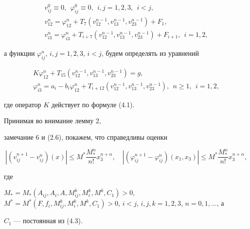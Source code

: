\begin{gather}


v_{ij}^0 \equiv 0,\ \ \varphi_{ij}^0 \equiv 0,\ \ i,j=1,2,3,\ \ i<j, \\


v_{12}^n=\varphi_{12}^n +T_7(v_{12}^{n-1},v_{13}^{n-1},v_{23}^{n-1})+F_1,\\


v_{i3}^n=\varphi_{i3}^n +T_{i+7}(v_{12}^{n-1},v_{13}^{n-1},v_{23}^{n-1})+


F_{i+1},\ \ i=1,2,


\end{gather}


а функции $\varphi_{ij}^n$, $i,j=1,2,3$, $i<j$, будем определять из уравнений




\begin{gather}


K\varphi_{12}^n +T_{15}(v_{12}^{n-1},v_{13}^{n-1},v_{23}^{n-1})=g, \\


\varphi_{i3}^n=a_i-b_i \varphi_{12}^n +T_{i+12}(v_{12}^{n-1},v_{13}^{n-1},


v_{23}^{n-1}),\ \ n \geq 1,\ \ i=1,2,


\end{gather}


где оператор $K$ действует по формуле (4.1).





Принимая во внимание лемму 2,


замечание 6 и (2.6), покажем, что справедливы оценки




\begin{equation}


|(v_{ij}^{n+1}-v_{ij}^n)(x)|\leq M^*\frac{M_*^n}{n!}x_3^{n+\alpha},\quad


|(\varphi_{ij}^{n+1}-\varphi_{ij}^n)(x_1,x_3)|\leq M^*\frac{M_*^n}{n!}


x_3^{n+\alpha},


\end{equation}


где


$M_*=M_*(A_{ij},A_i,A,M_{ij}^k,M_i^k,M^k,C_1)>0$, $M^*=


M^*(F,f_i,M_{ij}^k,M_i^k,M^k,C_1)>0$, $i<j$, $i,j,k=1,2,3$, $n=0,1,\dotsc$, а


$C_1$ --- постоянная из (4.3).





